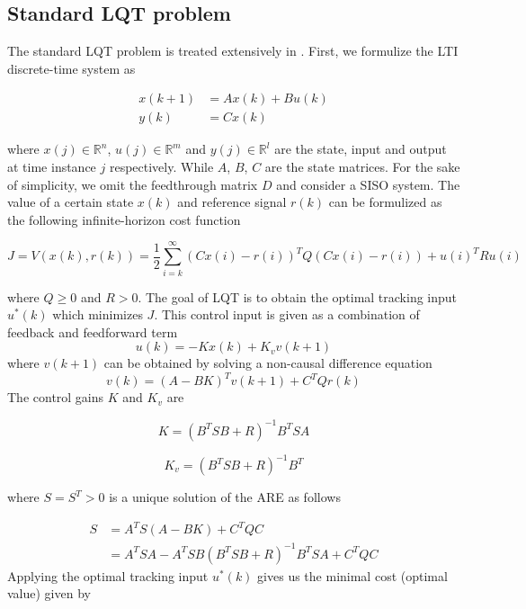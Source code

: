 \subsection{Standard \acs{LQT} problem}
The standard \acs {LQT} problem is treated extensively in \cite{lewis1995optimal}. First, we formulize the \ac {LTI} discrete-time system as 

\begin{equation} \label{eq:ss}
\begin{split}
x(k+1) &= Ax(k) + Bu(k) \\
y(k) &= Cx(k)
\end{split}
\end{equation}

where $x(j) \in \mathbb{R}^n$, $u(j) \in \mathbb{R}^m$ and $y(j) \in \mathbb{R}^l$ are the state, input and output at time instance $j$ respectively. While $A$, $B$, $C$ are the state matrices. For the sake of simplicity, we omit the feedthrough matrix $D$ and consider a \ac {SISO} system. The value of a certain state $x(k)$ and reference signal $r(k)$ can be formulized as the following infinite-horizon cost function

\begin{equation}
\label{eq:infcost}
J = V(x(k), r(k)) = \frac{1}{2} \sum_{i=k}^{\infty} (Cx(i)-r(i))^TQ(Cx(i)-r(i)) + u(i)^TRu(i)
\end{equation}

where $Q \geq 0$ and $R > 0$. The goal of \acs {LQT} is to obtain the optimal tracking input $u^*(k)$ which minimizes $J$. This control input is given as a combination of feedback and feedforward term
\begin{equation}
u(k) = -Kx(k) + K_vv(k+1)
\end{equation}
where $v(k+1)$ can be obtained by solving a non-causal difference equation
\begin{equation}
v(k) = (A-BK)^Tv(k+1) + C^TQr(k)
\label{eq:noncausal}
\end{equation}
The control gains $K$ and $K_v$ are

\begin{equation}
K = (B^TSB + R)^{-1}B^TSA
\end{equation}

\begin{equation}
K_v = (B^TSB + R)^{-1}B^T
\end{equation}

where $S=S^T>0$ is a unique solution of the \ac {ARE} as follows

\begin{equation}
\begin{split}
S &= A^TS(A-BK) + C^TQC \\
&= A^TSA - A^TSB(B^TSB+R)^{-1}B^TSA + C^TQC
\end{split}
\end{equation}
Applying the optimal tracking input $u^*(k)$ gives us the minimal cost (optimal value) given by

